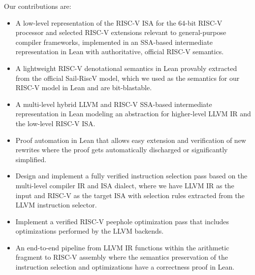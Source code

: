 \documentclass[review, anonymous, acmsmall, screen]{acmart}
\begin{document}
 Our contributions are:
\begin{itemize}
\item {A low-level representation of the RISC-V ISA for the 64-bit RISC-V processor and selected RISC-V extensions relevant to general-purpose compiler frameworks, implemented in an SSA-based intermediate representation in Lean with authoritative, official RISC-V semantics.}
\item{A lightweight RISC-V denotational semantics in Lean provably extracted from the official Sail-RiscV model, which we used as the semantics for our RISC-V model in Lean and are bit-blastable.}
\item {A multi-level hybrid LLVM and RISC-V SSA-based intermediate representation in Lean modeling an abstraction for higher-level LLVM IR and the low-level RISC-V ISA.}


\item {Proof automation in Lean that allows easy extension and verification of new rewrites where the proof gets automatically discharged or significantly simplified.}

\item {Design and implement a fully verified instruction selection pass based on the multi-level compiler IR and ISA dialect, where we have LLVM IR as the input and RISC-V as the target ISA with selection rules extracted from the LLVM instruction selector.}

\item {Implement a verified RISC-V peephole optimization pass that includes optimizations performed by the LLVM backends.}

\item {An end-to-end pipeline from LLVM IR functions within the arithmetic fragment to RISC-V assembly where the semantics preservation of the instruction selection and optimizations have a correctness proof in Lean.}


\end{itemize}
\end{document}
